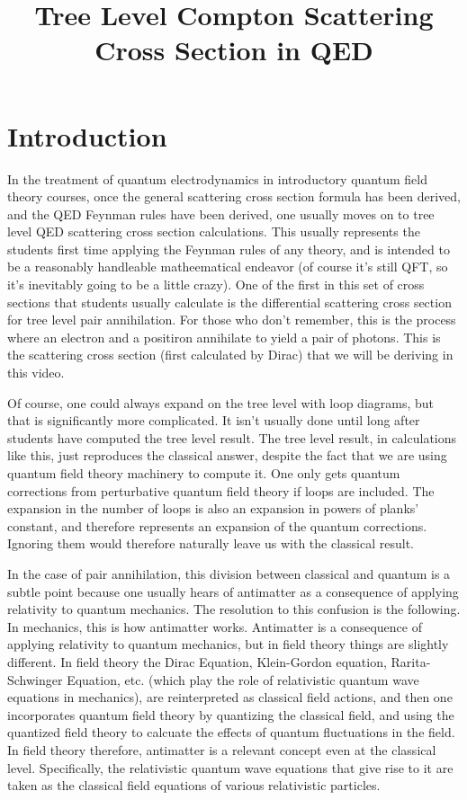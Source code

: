 \documentclass[a4]{article}
\begin{document}
    \title{Tree Level Compton Scattering Cross Section in QED}
    \maketitle

    \section*{Introduction}

    In the treatment of quantum electrodynamics in introductory quantum field theory courses, once the general scattering cross section formula has been derived, and the QED Feynman rules have been derived,
    one usually moves on to tree level QED scattering cross section calculations. This usually represents the students first time applying the Feynman rules of any theory, and is intended to be a reasonably
    handleable matheematical endeavor (of course it's still QFT, so it's inevitably going to be a little crazy). One of the first in this set of cross sections that students usually calculate is the differential
    scattering cross section for tree level pair annihilation. For those who don't remember, this is the process where an electron and a positiron annihilate to yield a pair of photons. This is the scattering 
    cross section (first calculated by Dirac) that we will be deriving in this video.

    Of course, one could always expand on the tree level with loop diagrams, but that is significantly more complicated. It isn't usually done until long after students have computed the tree level result.
    The tree level result, in calculations like this, just reproduces the classical answer, despite the fact that we are using quantum field theory machinery to compute it. One only gets quantum corrections from
    perturbative quantum field theory if loops are included. The expansion in the number of loops is also an expansion in powers of planks' constant, and therefore represents an expansion of the quantum corrections.
    Ignoring them would therefore naturally leave us with the classical result.

    In the case of pair annihilation, this division between classical and quantum is a subtle point because one usually hears of antimatter as a consequence of applying relativity to quantum mechanics. The
    resolution to this confusion is the following. In mechanics, this is how antimatter works. Antimatter is a consequence of applying relativity to quantum mechanics, but in field theory things are slightly
    different. In field theory the Dirac Equation, Klein-Gordon equation, Rarita-Schwinger Equation, etc. (which play the role of relativistic quantum wave equations in mechanics), are reinterpreted as classical
    field actions, and then one incorporates quantum field theory by quantizing the classical field, and using the quantized field theory to calcuate the effects of quantum fluctuations in the field. In field
    theory therefore, antimatter is a relevant concept even at the classical level. Specifically, the relativistic quantum wave equations that give rise to it are taken as the classical field equations of various
    relativistic particles.
\end{document}
